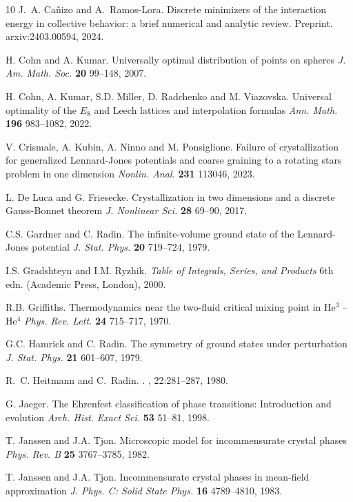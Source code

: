 \documentclass[12pt]{iopart}
\theoremstyle{definition}
\begin{document}
\begin{thebibliography}{10}
J.~A. Ca{\~n}izo and A.~Ramos-Lora.
\newblock Discrete minimizers of the interaction energy in collective behavior:
  a brief numerical and analytic review.
\newblock Preprint. arxiv:2403.00594, 2024.

 H. Cohn and A. Kumar.
Universally optimal distribution of points on spheres
{\it J. Am. Math. Soc.} {\bf 20} 99--148, 2007.

 H. Cohn, A. Kumar, S.D. Miller, D. Radchenko and M. Viazovska.
Universal optimality of the $E_8$ and Leech lattices and interpolation formulas
{\it Ann. Math.} {\bf 196} 983--1082, 2022.

 V. Crismale, A. Kubin, A. Ninno and M. Ponsiglione.
Failure of crystallization for generalized Lennard-Jones potentials and
coarse graining to a rotating stars problem in one dimension  
{\it Nonlin. Anal.} {\bf 231} 113046, 2023.

 L. De Luca and G. Friesecke.
Crystallization in two dimensions and a discrete Gauss-Bonnet theorem
{\it J. Nonlinear Sci.} {\bf 28} 69--90, 2017.

 C.S. Gardner and C. Radin.
The infinite-volume ground state of the Lennard-Jones potential
{\it J. Stat. Phys.} {\bf 20} 719--724, 1979.

 I.S. Gradshteyn and I.M. Ryzhik.
{\it Table of Integrals, Series, and Products} 
6th edn. (Academic Press, London), 2000.

 R.B. Griffiths.
Thermodynamics near the two-fluid critical mixing point in He$^3$ -- He$^4$
{\it Phys. Rev. Lett.} {\bf 24} 715--717, 1970.

 G.C. Hamrick and C. Radin.
The symmetry of ground states under perturbation
{\it J. Stat. Phys.} {\bf 21} 601--607, 1979.

R.~C. Heitmann and C.~Radin.
.
, 22:281--287, 1980.

 G. Jaeger.
The Ehrenfest classification of phase transitions: Introduction and evolution
{\it Arch. Hist. Exact Sci.} {\bf 53} 51--81, 1998.

 T. Janssen and J.A. Tjon.
Microscopic model for incommensurate crystal phases
{\it Phys. Rev. B} {\bf 25} 3767--3785, 1982.

  T. Janssen and J.A. Tjon.
Incommensurate crystal phases in mean-field approximation
{\it J. Phys. C: Solid State Phys.} {\bf 16} 4789--4810, 1983.


\end{thebibliography}
\end{document}
